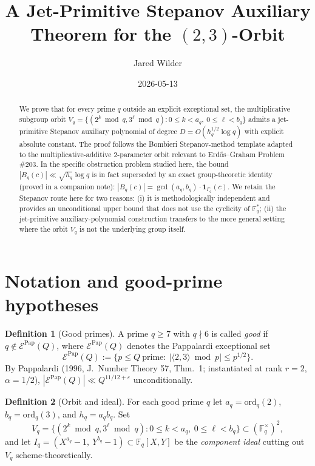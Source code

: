 \documentclass[12pt]{amsart}
\title{A Jet-Primitive Stepanov Auxiliary Theorem for the $(2,3)$-Orbit}
\author{Jared Wilder}
\date{2026-05-13}
\theoremstyle{definition}
\newtheorem{definition}{Definition}
\theoremstyle{remark}
\begin{document}
\maketitle

\begin{abstract}
We prove that for every prime $q$ outside an explicit exceptional set, the
multiplicative subgroup orbit
$V_q = \{(2^k \bmod q, 3^\ell \bmod q) : 0 \le k < a_q,\ 0 \le \ell < b_q\}$
admits a jet-primitive Stepanov auxiliary polynomial of degree
$D = O(h_q^{1/2}\log q)$ with explicit absolute constant. The proof
follows the Bombieri Stepanov-method template adapted to the
multiplicative-additive 2-parameter orbit relevant to Erd\H{o}s--Graham
Problem \#203. In the specific obstruction problem studied here, the bound
$|B_q(c)| \ll \sqrt{h_q}\log q$ is in fact superseded by an exact
group-theoretic identity (proved in a companion note): $|B_q(c)| = \gcd(a_q,b_q)\cdot\mathbf{1}_{\Gamma_q}(c)$. We retain the Stepanov route here for two reasons: (i) it is methodologically independent and provides an unconditional upper bound that does not use the cyclicity of $\mathbb{F}_q^*$; (ii) the jet-primitive auxiliary-polynomial construction transfers to the more general setting where the orbit $V_q$ is not the underlying group itself.
\end{abstract}

\section{Notation and good-prime hypotheses}

\begin{definition}[Good primes]
A prime $q \ge 7$ with $q \nmid 6$ is called \emph{good} if
$q \notin \mathcal{E}^{\mathrm{Pap}}(Q)$, where $\mathcal{E}^{\mathrm{Pap}}(Q)$
denotes the Pappalardi exceptional set
$$
\mathcal{E}^{\mathrm{Pap}}(Q) := \{ p \le Q\ \mathrm{prime} :\
|\langle 2, 3\rangle \bmod p| \le p^{1/2}\}.
$$
By Pappalardi (1996, J.\ Number Theory 57, Thm.\ 1; instantiated at
rank $r=2$, $\alpha = 1/2$),
$|\mathcal{E}^{\mathrm{Pap}}(Q)| \ll Q^{11/12 + \varepsilon}$ unconditionally.
\end{definition}

\begin{definition}[Orbit and ideal]
For each good prime $q$ let
$a_q = \mathrm{ord}_q(2)$, $b_q = \mathrm{ord}_q(3)$, and
$h_q = a_q b_q$. Set
$$
V_q = \{(2^k \bmod q, 3^\ell \bmod q) :
0 \le k < a_q, \ 0 \le \ell < b_q\} \subset (\mathbb{F}_q^\times)^2,
$$
and let $I_q = (X^{a_q} - 1,\ Y^{b_q} - 1) \subset \mathbb{F}_q[X, Y]$ be
the \emph{component ideal} cutting out $V_q$ scheme-theoretically.
\end{definition}
\end{document}
